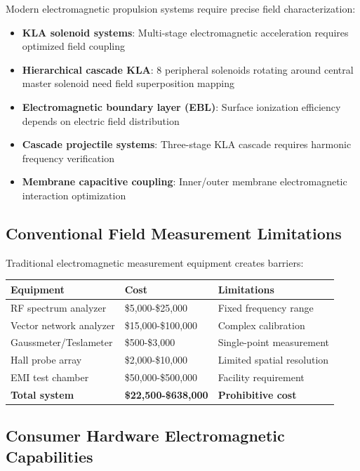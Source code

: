 \documentclass[12pt,a4paper]{article}
\begin{document}
Modern electromagnetic propulsion systems require precise field characterization:

\begin{itemize}
\item \textbf{KLA solenoid systems}: Multi-stage electromagnetic acceleration requires optimized field coupling
\item \textbf{Hierarchical cascade KLA}: 8 peripheral solenoids rotating around central master solenoid need field superposition mapping
\item \textbf{Electromagnetic boundary layer (EBL)}: Surface ionization efficiency depends on electric field distribution
\item \textbf{Cascade projectile systems}: Three-stage KLA cascade requires harmonic frequency verification
\item \textbf{Membrane capacitive coupling}: Inner/outer membrane electromagnetic interaction optimization
\end{itemize}

\subsection{Conventional Field Measurement Limitations}

Traditional electromagnetic measurement equipment creates barriers:

\begin{center}
\begin{tabular}{|l|l|l|}
\hline
\textbf{Equipment} & \textbf{Cost} & \textbf{Limitations} \\
\hline
RF spectrum analyzer & \$5,000-\$25,000 & Fixed frequency range \\
Vector network analyzer & \$15,000-\$100,000 & Complex calibration \\
Gaussmeter/Teslameter & \$500-\$3,000 & Single-point measurement \\
Hall probe array & \$2,000-\$10,000 & Limited spatial resolution \\
EMI test chamber & \$50,000-\$500,000 & Facility requirement \\
\hline
\textbf{Total system} & \textbf{\$22,500-\$638,000} & \textbf{Prohibitive cost} \\
\hline
\end{tabular}
\end{center}

\subsection{Consumer Hardware Electromagnetic Capabilities}
\end{document}
